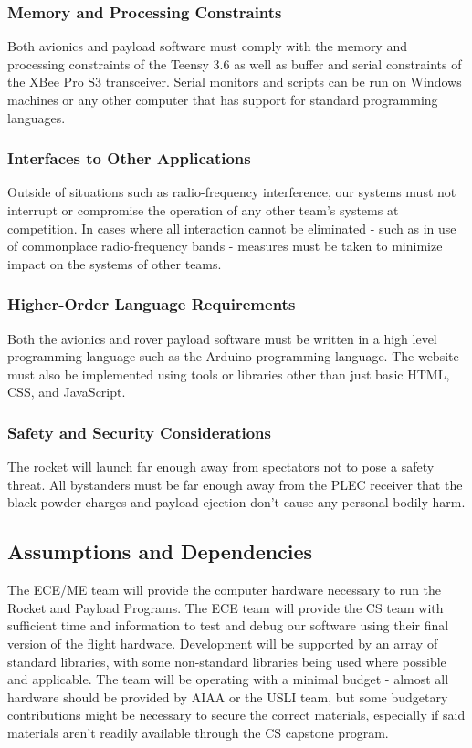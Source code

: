 \documentclass[onecolumn, draftclsnofoot, 10pt, compsoc]{IEEEtran}
\begin{document}
\subsubsection{Memory and Processing Constraints}
Both avionics and payload software must comply with the memory and processing constraints of the Teensy 3.6 as well as buffer and serial constraints of the XBee Pro S3 transceiver. Serial monitors and scripts can be run on Windows machines or any other computer that has support for standard programming languages.

\subsubsection{Interfaces to Other Applications}
Outside of situations such as radio-frequency interference, our systems must not interrupt or compromise the operation of any other team's systems at competition. In cases where all interaction cannot be eliminated - such as in use of commonplace radio-frequency bands - measures must be taken to minimize impact on the systems of other teams.

\subsubsection{Higher-Order Language Requirements}
Both the avionics and rover payload software must be written in a high level programming language such as the Arduino programming language. The website must also be implemented using tools or libraries other than just basic HTML, CSS, and JavaScript.

\subsubsection{Safety and Security Considerations}
The rocket will launch far enough away from spectators not to pose a safety threat. All bystanders must be far enough away from the PLEC receiver that the black powder charges and payload ejection don't cause any personal bodily harm.

\subsection{Assumptions and Dependencies}
The ECE/ME team will provide the computer hardware necessary to run the Rocket and Payload Programs. The ECE team will provide the CS team with sufficient time and information to test and debug our software using their final version of the flight hardware. Development will be supported by an array of standard libraries, with some non-standard libraries being used where possible and applicable. The team will be operating with a minimal budget - almost all hardware should be provided by AIAA or the USLI team, but some budgetary contributions might be necessary to secure the correct materials, especially if said materials aren't readily available through the CS capstone program.
\end{document}
